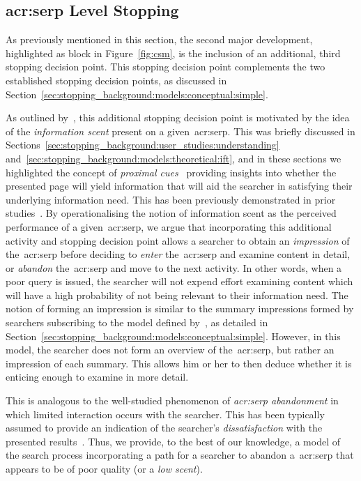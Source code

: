 \subsection{\gls{acr:serp} Level Stopping}\label{sec:csm:new_stopping}
As previously mentioned in this section, the second major development, highlighted as block  in Figure~\ref{fig:csm}, is the inclusion of an additional, third stopping decision point. This stopping decision point complements the two established stopping decision points, as discussed in Section~\ref{sec:stopping_background:models:conceptual:simple}.

As outlined by~\cite{maxwell2018serp}, this additional stopping decision point is motivated by the idea of the \emph{information scent} present on a given~\gls{acr:serp}. This was briefly discussed in Sections~\ref{sec:stopping_background:user_studies:understanding} and~\ref{sec:stopping_background:models:theoretical:ift}, and in these sections we highlighted the concept of \emph{proximal cues}~\citep{chi2001information_scent} providing insights into whether the presented page will yield information that will aid the searcher in satisfying their underlying information need. This has been previously demonstrated in prior studies~\citep{wu2014information_scent, ong2017scent_behaviour, maxwell2017snippets}. By operationalising the notion of information scent as the perceived performance of a given~\gls{acr:serp}, we argue that incorporating this additional activity and stopping decision point allows a searcher to obtain an \emph{impression} of the~\gls{acr:serp} before deciding to \emph{enter} the~\gls{acr:serp} and examine content in detail, or \emph{abandon} the~\gls{acr:serp} and move to the next activity. In other words, when a poor query is issued, the searcher will not expend effort examining content which will have a high probability of not being relevant to their information need. The notion of forming an impression is similar to the summary impressions formed by searchers subscribing to the model defined by~\cite{thomas2014modelling_behaviour}, as detailed in Section~\ref{sec:stopping_background:models:conceptual:simple}. However, in this model, the searcher does not form an overview of the~\gls{acr:serp}, but rather an impression of each summary. This allows him or her to then deduce whether it is enticing enough to examine in more detail.

This is analogous to the well-studied phenomenon of \emph{\gls{acr:serp} abandonment} in which limited interaction occurs with the searcher. This has been typically assumed to provide an indication of the searcher's \emph{dissatisfaction} with the presented results~\citep{dassarma2008serp_abandonment, chuklin2012serp_abandonment}. Thus, we provide, to the best of our knowledge, a model of the search process incorporating a path for a searcher to abandon a~\gls{acr:serp} that appears to be of poor quality (or a \emph{low scent}).

